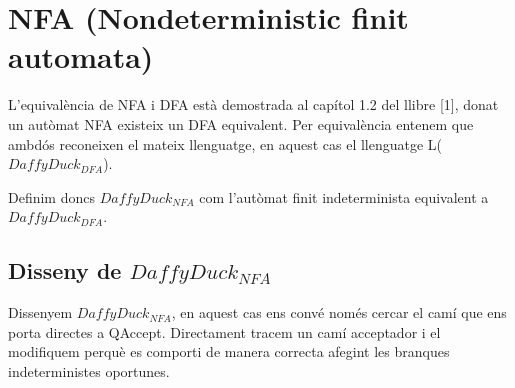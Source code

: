 \documentclass[12pt,a4paper]{report}
\def \dfa{$DaffyDuck_{DFA} $}
\def \nfa{$DaffyDuck_{NFA} $}
\begin{document}
\clearpage

\section{NFA (Nondeterministic finit automata)}

L’equivalència de NFA i DFA està demostrada al capítol 1.2 del llibre [1], donat un autòmat NFA existeix un DFA equivalent. Per equivalència entenem que ambdós reconeixen el mateix llenguatge, en aquest cas el llenguatge L(\dfa{}).

Definim doncs \nfa{} com l’autòmat finit indeterminista equivalent a \dfa{}.

\subsection{Disseny de \nfa{}}

Dissenyem \nfa{}, en aquest cas ens convé només cercar el camí que ens porta directes a QAccept. Directament tracem un camí acceptador i el modifiquem perquè es comporti de manera correcta afegint les branques indeterministes oportunes.
\end{document}
